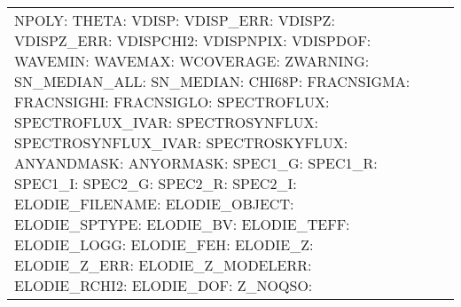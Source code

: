 \documentclass[onecolumn]{aa}
\begin{document}
\begin{table}
\begin{center}
\begin{tabular}{ L{3.5cm} L{4cm} L{11cm} }
NPOLY:  \newline 
THETA:  \newline 
VDISP:  \newline 
VDISP\_ERR:  \newline 
VDISPZ:  \newline 
VDISPZ\_ERR:  \newline 
VDISPCHI2:  \newline 
VDISPNPIX:  \newline 
VDISPDOF:  \newline 
WAVEMIN:  \newline 
WAVEMAX:  \newline 
WCOVERAGE:  \newline 
ZWARNING:  \newline 
SN\_MEDIAN\_ALL:  \newline 
SN\_MEDIAN:  \newline 
CHI68P:  \newline 
FRACNSIGMA:  \newline 
FRACNSIGHI:  \newline 
FRACNSIGLO:  \newline 
SPECTROFLUX:  \newline 
SPECTROFLUX\_IVAR:  \newline 
SPECTROSYNFLUX:  \newline 
SPECTROSYNFLUX\_IVAR:  \newline 
SPECTROSKYFLUX:  \newline 
ANYANDMASK:  \newline 
ANYORMASK:  \newline 
SPEC1\_G:  
SPEC1\_R:  
SPEC1\_I:  \newline 
SPEC2\_G:   
SPEC2\_R:   
SPEC2\_I:  \newline 
ELODIE\_FILENAME:  \newline 
ELODIE\_OBJECT:  \newline 
ELODIE\_SPTYPE:  \newline 
ELODIE\_BV:  \newline 
ELODIE\_TEFF:  \newline 
ELODIE\_LOGG:  \newline 
ELODIE\_FEH:  \newline 
ELODIE\_Z:  \newline 
ELODIE\_Z\_ERR:  \newline 
ELODIE\_Z\_MODELERR:  \newline 
ELODIE\_RCHI2:  \newline 
ELODIE\_DOF:  \newline 
Z\_NOQSO:  \newline 

\end{tabular}
\end{center}
\end{table}
\end{document}
